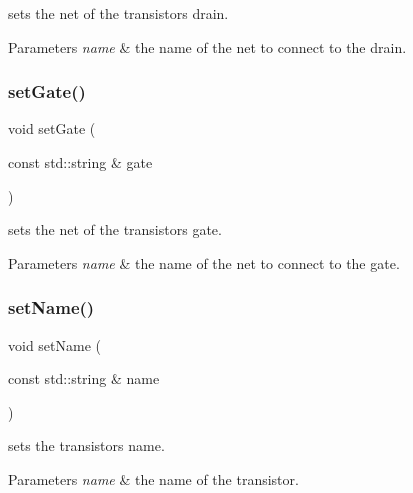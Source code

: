 sets the net of the transistor\textquotesingle{}s drain. 


\begin{DoxyParams}{Parameters}
{\em name} & the name of the net to connect to the drain. \\
\hline
\end{DoxyParams}
\mbox{\label{class_open_chams_1_1_transistor_a705b53a51f0e265533b228f6e8beaf50}} 
\subsubsection{\texorpdfstring{set\+Gate()}{setGate()}}
{\footnotesize\ttfamily void set\+Gate (\begin{DoxyParamCaption}\item[{const std\+::string \&}]{gate }\end{DoxyParamCaption})}



sets the net of the transistor\textquotesingle{}s gate. 


\begin{DoxyParams}{Parameters}
{\em name} & the name of the net to connect to the gate. \\
\hline
\end{DoxyParams}
\mbox{\label{class_open_chams_1_1_transistor_a36c59a26f0317be12cea01f8dea24ec7}} 
\subsubsection{\texorpdfstring{set\+Name()}{setName()}}
{\footnotesize\ttfamily void set\+Name (\begin{DoxyParamCaption}\item[{const std\+::string \&}]{name }\end{DoxyParamCaption})\hspace{0.3cm}{\ttfamily [inline]}}



sets the transistor\textquotesingle{}s name. 


\begin{DoxyParams}{Parameters}
{\em name} & the name of the transistor. \\
\hline
\end{DoxyParams}
\mbox{\label{class_open_chams_1_1_transistor_abc4a5d86e639ea13e27551722e2f9c17}} 
